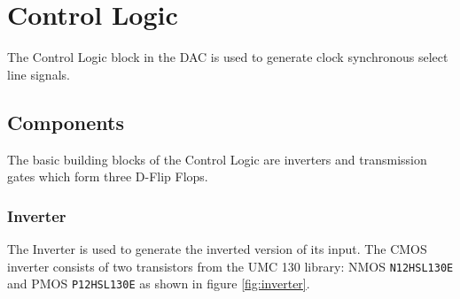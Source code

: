 \documentclass[parskip,oneside,colorbacktitle,10pt,accentcolor=tud1b]{tudreport}
\begin{document}
{\chapter{Control Logic}

The Control Logic block in the DAC is used to generate clock synchronous select line signals.

\section{Components}

The basic building blocks of the Control Logic are inverters and transmission gates which form three D-Flip Flops.

\subsection{Inverter}

The Inverter is used to generate the inverted version of its input. The CMOS inverter consists of two transistors from the UMC 130 library: NMOS \texttt{N12HSL130E} and PMOS \texttt{P12HSL130E} as shown in figure \ref{fig:inverter}. 

}
\end{document}
